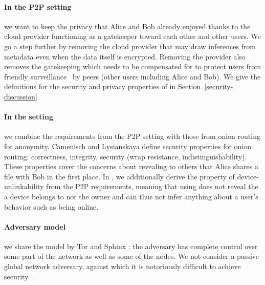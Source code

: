 \paragraph*{In the \ac{P2P} setting} we want to keep the privacy that
Alice and Bob already enjoyed thanks to the cloud provider functioning
as a gatekeeper toward each other and other users. We go a step
further by removing the cloud provider that may draw inferences from
metadata even when the data itself is encrypted. Removing the provider
also removes the gatekeeping which needs to be compensated for to
protect users from friendly surveillance~\cite{FriendlySurveillance}
by peers (other \name users including Alice and Bob). We give the definitions for the
security and privacy properties of \name in Section~\ref{security-discussion}. 

\paragraph*{In the \name setting} we combine the requirements from
the \ac{P2P} setting with those from onion routing for anonymity.
Camenisch and Lysianskaya \cite{} define security properties for onion
routing: correctness, integrity, security (wrap resistance,
indistinguishability). These properties cover the concerns about
revealing to others that Alice shares a file with Bob in the first
place. In \name, we additionally derive the property of
device-unlinkability from the \ac{P2P} requirements, meaning that
using \name does not reveal the \squad a device belongs to nor the
owner and can thus not infer anything about a user's behavior such as
being online.

\paragraph*{Adversary model} we share the model by Tor \cite{} and
Sphinx \cite{}: the adversary has complete control over some part of
the network as well as some of the nodes. We not consider a passive
global network adversary, against which it is notoriously difficult to
achieve security~\cite{SystemsForAnonymousCommunication}.
